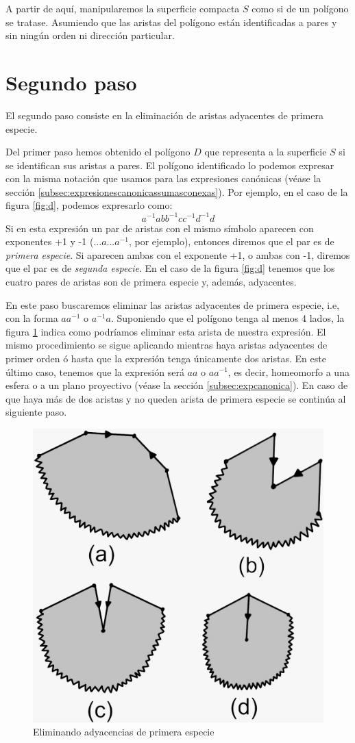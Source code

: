 \documentclass[a4paper,11pt,spanish, twoside, leqno]{tfg-uam}
\theoremstyle{definition}
\begin{document}
A partir de aquí, manipularemos la superficie compacta $S$ como si de un polígono se tratase. Asumiendo que las aristas del polígono están identificadas a pares y sin ningún orden ni dirección particular.


\section{Segundo paso}

El segundo paso consiste en la eliminación de aristas adyacentes de primera especie.


Del primer paso hemos obtenido el polígono $D$ que representa a la superficie $S$ si se identifican sus aristas a pares. El polígono identificado lo podemos expresar con la misma notación que usamos para las expresiones canónicas (véase la sección \ref{subsec:expresionescanonicassumasconexas}). Por ejemplo, en el caso de la figura \ref{fig:d}, podemos expresarlo como:
\[
a^{-1}abb^{-1}cc^{-1}d^{-1}d
\]
Si en esta expresión un par de aristas con el mismo símbolo aparecen  con exponentes +1 y -1 ($...a...a^{-1}$, por ejemplo), entonces diremos que el par es de \textit{primera especie}. Si aparecen ambas con el exponente +1, o ambas con -1, diremos que el par es de \textit{segunda especie}. En el caso de la figura \ref{fig:d} tenemos que los cuatro pares de aristas son de primera especie y, además, adyacentes.


En este paso buscaremos eliminar las aristas adyacentes de primera especie, i.e, con la forma $aa^{-1}$ o $a^{-1}a$. Suponiendo que el polígono tenga al menos 4 lados, la figura \ref{fig:paso2} indica como podríamos eliminar esta arista de nuestra expresión. El mismo procedimiento se sigue aplicando mientras haya aristas adyacentes de primer orden ó hasta que la expresión tenga únicamente dos aristas. En este último caso, tenemos que la expresión será $aa$ o $aa^{-1}$, es decir, homeomorfo a una esfera o a un plano proyectivo (véase la sección \ref{subsec:expcanonica}). En caso de que haya más de dos aristas y no queden arista de primera especie se continúa al siguiente paso.
\begin{figure}[h!]
			\centering
			\includegraphics[width=0.4\linewidth]{imagenes/paso2.jpeg}
			\caption{Eliminando adyacencias de primera especie}
			\label{fig:paso2}
		\end{figure}
\end{document}
